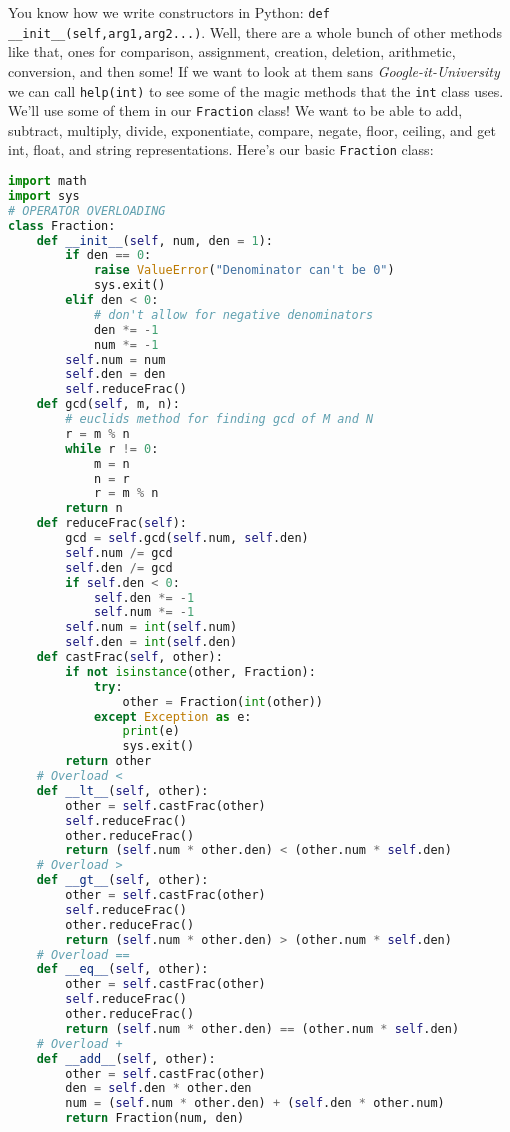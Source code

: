 \documentclass[11pt, twoside, reqno]{book}
\begin{document}
You know how we write constructors in Python: \texttt{def \_\_init\_\_(self,arg1,arg2...)}. Well, there are a whole bunch of other methods like that, ones for comparison, assignment, creation, deletion, arithmetic, conversion, and then some! If we want to look at them sans \textit{Google-it-University} we can call \texttt{help(int)} to see some of the magic methods that the \texttt{int} class uses. We'll use some of them in our \texttt{Fraction} class! We want to be able to add, subtract, multiply, divide, exponentiate, compare, negate, floor, ceiling, and get int, float, and string representations. Here's our basic \texttt{Fraction} class:
\begin{lstlisting}[language=Python]
import math
import sys
# OPERATOR OVERLOADING
class Fraction:
    def __init__(self, num, den = 1):
        if den == 0:
            raise ValueError("Denominator can't be 0")
            sys.exit()
        elif den < 0:
            # don't allow for negative denominators
            den *= -1
            num *= -1
        self.num = num
        self.den = den
        self.reduceFrac()
    def gcd(self, m, n):
        # euclids method for finding gcd of M and N
        r = m % n
        while r != 0:
            m = n
            n = r
            r = m % n
        return n
    def reduceFrac(self):
        gcd = self.gcd(self.num, self.den)
        self.num /= gcd
        self.den /= gcd
        if self.den < 0:
            self.den *= -1
            self.num *= -1
        self.num = int(self.num)
        self.den = int(self.den)
    def castFrac(self, other):
        if not isinstance(other, Fraction):
            try:
                other = Fraction(int(other))
            except Exception as e:
                print(e)
                sys.exit()
        return other
    # Overload <
    def __lt__(self, other):
        other = self.castFrac(other)
        self.reduceFrac()
        other.reduceFrac()
        return (self.num * other.den) < (other.num * self.den)
    # Overload >
    def __gt__(self, other):
        other = self.castFrac(other)
        self.reduceFrac()
        other.reduceFrac()
        return (self.num * other.den) > (other.num * self.den)
    # Overload ==
    def __eq__(self, other):
        other = self.castFrac(other)
        self.reduceFrac()
        other.reduceFrac()
        return (self.num * other.den) == (other.num * self.den)
    # Overload +
    def __add__(self, other):
        other = self.castFrac(other)
        den = self.den * other.den
        num = (self.num * other.den) + (self.den * other.num)
        return Fraction(num, den)

\end{lstlisting}
\end{document}
